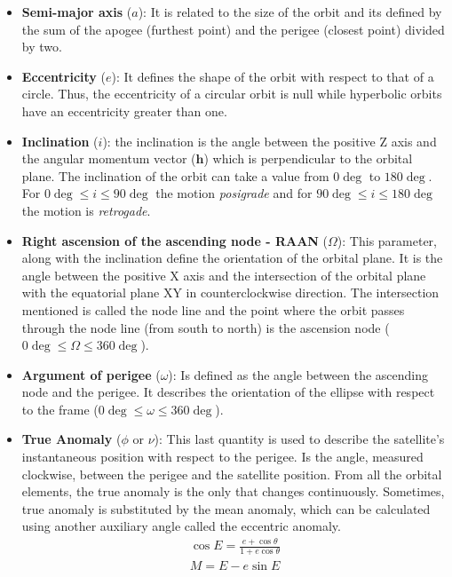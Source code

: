 \begin{itemize}
\item\textbf{Semi-major axis} ($a$): It is related to the size of the orbit and its defined by the sum of the apogee (furthest point) and the perigee (closest point) divided by two.
\item\textbf{Eccentricity} ($e$): It defines the shape of the orbit with respect to that of a circle. Thus, the eccentricity of a circular orbit is null while hyperbolic orbits have an eccentricity greater than one.
\item\textbf{Inclination} ($i$): the inclination is the angle between the positive Z axis and the angular momentum vector ($\textbf{h}$) which is perpendicular to the orbital plane. The inclination of the orbit can take a value from $0\deg$ to $180\deg$. For $0\deg\leq i\leq 90\deg$ the motion \textit{posigrade} and for $90\deg\leq i\leq 180\deg$ the motion is \textit{retrogade}.
\item\textbf{Right ascension of the ascending node - RAAN} ($\Omega$): This parameter, along with the inclination define the orientation of the orbital plane. It is the angle between the positive X axis and the intersection of the orbital plane with the equatorial plane XY in counterclockwise direction. The intersection mentioned is called the node line and the point where the orbit passes through the node line (from south to north) is the ascension node ($0\deg\leq \Omega\leq 360\deg$).
\item\textbf{Argument of perigee} ($\omega$): Is defined as the angle between the ascending node and the perigee. It describes the orientation of the ellipse with respect to the frame ($0\deg\leq \omega\leq 360\deg$). 
\item\textbf{True Anomaly} ($\phi$ or $\nu$): This last quantity is used to describe the satellite's instantaneous position with respect to the perigee. Is the angle, measured clockwise, between the perigee and the satellite position. From all the orbital elements, the true anomaly is the only that changes continuously. Sometimes, true anomaly is substituted by the mean anomaly, which can be calculated using another auxiliary angle called the eccentric anomaly.
\begin{equation}
\begin{gathered}
\cos E=\frac{e+\cos \theta}{1+e\cos \theta}\\
M=E-e\sin E
\end{gathered}
\end{equation}

\end{itemize}

